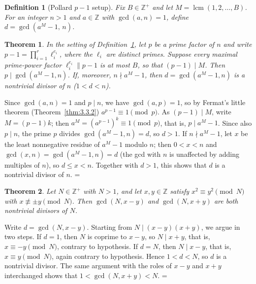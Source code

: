 \documentclass[11pt]{article}
\makeatletter
\let\nt@closedisplay\]
\def\nt@guardedclose{\@ifnextchar\par{\nt@closeafterpar}{\@ifnextchar\end{\postdisplaypenalty\@M\nt@closedisplay}{\nt@closedisplay}}}
\def\nt@closeafterpar\par{\@ifnextchar\par{\nt@closeafterpar}{\@ifnextchar\end{\postdisplaypenalty\@M\nt@closedisplay\par}{\nt@closedisplay\par}}}
\renewenvironment{proof}[1][\proofname]{\par
  \pushQED{\qed}\normalfont\topsep\medskipamount\edef\nt@afterproof{\@endparpenalty=\the\@endparpenalty\relax}\@beginparpenalty\@M\@endparpenalty\@M\let\]\nt@guardedclose\trivlist\item[]\textit{#1\@addpunct{.}} \ignorespaces}{\ifvmode\addpenalty\@M\fi\popQED\nt@afterproof\endtrivlist\@endpefalse}
\theoremstyle{ntstyle}
\newtheorem{theorem}{Theorem}[subsection]
\newtheorem{definition}{Definition}[subsection]
\DeclareMathOperator{\lcm}{lcm}
\makeatother
\begin{document}
\begin{definition}[Pollard $p-1$ setup]\label{def:9.5.1}\label{def:pollard-p-1-setup}
  Fix $B\in\mathbb{Z}^+$ and let
  $M=\lcm(1, 2, \ldots, B)$. For an integer $n>1$ and $a\in\mathbb{Z}$
  with $\gcd(a, n)=1$, define $d = \gcd(a^M-1, \, n)$.

\end{definition}

\begin{theorem}\label{thm:9.5.2} In the setting of
  Definition~\ref{def:9.5.1}, let $p$ be a prime factor of $n$ and write
  $p-1=\prod_{i=1}^{r}\ell_i^{e_i}$, where the $\ell_i$ are distinct
  primes. Suppose every maximal prime-power factor
  $\ell_i^{e_i}\parallel p-1$ is at most $B$, so that $(p-1)\mid M$.
  Then $p \mid \gcd(a^M-1, n)$. If, moreover, $n \nmid a^M-1$, then $d=\gcd(a^M-1, n)$ is a nontrivial divisor of
  $n$ ($1<d<n$).

\end{theorem}

\begin{proof} Since $\gcd(a, n)=1$ and $p\mid n$,
  we have $\gcd(a, p)=1$, so by Fermat's little theorem (Theorem~\ref{thm:3.3.2})
  $a^{p-1}\equiv1\pmod{p}$. As $(p-1)\mid M$, write $M=(p-1)k$; then
  $a^M=(a^{p-1})^k\equiv1\pmod{p}$, that is, $p\mid a^M-1$. Since also
  $p\mid n$, the prime $p$ divides $\gcd(a^M-1, n)=d$, so $d>1$. If $n\nmid a^M-1$, let $x$ be the least
  nonnegative residue of $a^M-1$ modulo
  $n$; then $0<x<n$ and $\gcd(x, n)=\gcd(a^M-1, n)=d$ (the gcd with $n$ is
  unaffected by adding multiples of $n$), so $d\le x<n$. Together with
  $d>1$, this shows that $d$ is a nontrivial divisor of $n$.
\end{proof}

\begin{theorem}\label{thm:9.5.3}
  Let $N\in\mathbb{Z}^+$ with $N>1$, and let $x,y\in\mathbb{Z}$ satisfy
  $x^{2}\equiv y^{2}\pmod{N}$ with $x\not\equiv\pm y\pmod{N}$.
  Then $\gcd(N,x-y)$ and $\gcd(N,x+y)$ are both nontrivial divisors of $N$.

\end{theorem}

\begin{proof} Write $d=\gcd(N,x-y)$. Starting from $N\mid(x-y)(x+y)$, we argue in
  two steps. If $d=1$, then $N$ is coprime to $x-y$, so $N\mid x+y$,
  that is, $x\equiv-y\pmod{N}$, contrary to hypothesis. If $d=N$, then
  $N\mid x-y$, that is, $x\equiv y\pmod{N}$, again contrary to hypothesis. Hence
  $1<d<N$, so $d$ is a nontrivial divisor. The same argument with the roles of
  $x-y$ and $x+y$ interchanged shows that $1<\gcd(N,x+y)<N$.
\end{proof}
\end{document}
